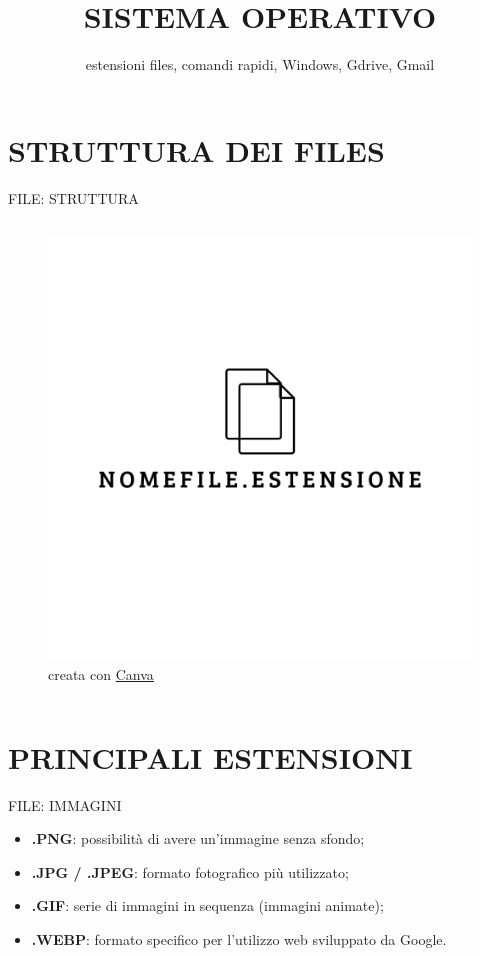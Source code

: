\documentclass[aspectratio=1610,handout]{beamer}
\title{SISTEMA OPERATIVO}
\subtitle{estensioni files, comandi rapidi, Windows, Gdrive, Gmail}
\date{}
\institute{\textit{
        Fonti:
        \begin{itemize}
            \item[-] \href{https://it.wikipedia.org/wiki/Lista_di_formati_di_file}{Wikipedia}
            \item[-] \href{https://support.microsoft.com/it-it/windows/scelte-rapide-da-tastiera-in-windows-dcc61a57-8ff0-cffe-9796-cb9706c75eec}{Documentazione Microsoft}
        \end{itemize}
    }
}
\begin{document}
\begin{frame}
    \titlepage
\end{frame}

\section{STRUTTURA DEI FILES}

\begin{frame}{FILE: STRUTTURA}
    \begin{columns}
        \begin{figure}
            \includegraphics[width=\linewidth]{img/file.png}
            \caption{{creata con \href{https://www.canva.com}{Canva}}}
        \end{figure}
    \end{columns}
\end{frame}

\section{PRINCIPALI ESTENSIONI}

\begin{frame}{FILE: IMMAGINI}
    \begin{itemize}
        \item \textbf{.PNG}: possibilità di avere un'immagine senza sfondo;
        \pause
        \item \textbf{.JPG / .JPEG}: formato fotografico più utilizzato;
        \pause
        \item \textbf{.GIF}: serie di immagini in sequenza (immagini animate);
        \pause
        \item \textbf{.WEBP}: formato specifico per l'utilizzo web sviluppato da Google.
    \end{itemize}
\end{frame}
\end{document}
